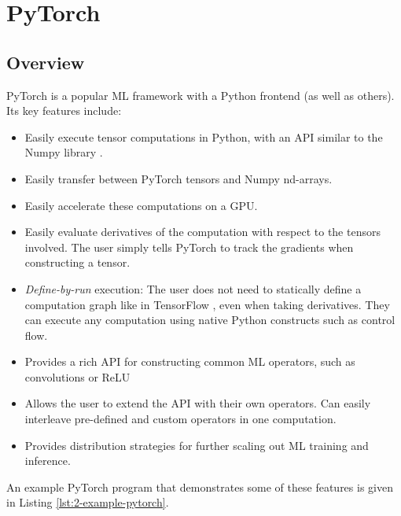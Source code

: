 \section{PyTorch}
\subsection{Overview}
PyTorch \cite{Paszke2017} is a popular ML framework with a Python frontend (as well as others).
Its key features include:
\begin{itemize}[topsep=0.2em, parsep=0.5\parskip]
    \item Easily execute tensor computations in Python, with an API similar to the Numpy library \cite{VanDerWalt2011}.
    \item Easily transfer between PyTorch tensors and Numpy nd-arrays.
    \item Easily accelerate these computations on a GPU.
    \item Easily evaluate derivatives of the computation with respect to the tensors involved.
    The user simply tells PyTorch to track the gradients when constructing a tensor.
    \item \textit{Define-by-run} execution: The user does not need to statically define a computation graph like in TensorFlow \cite{tensorflow2015-whitepaper}, even when taking derivatives.
    They can execute any computation using native Python constructs such as control flow.
    \item Provides a rich API for constructing common ML operators, such as convolutions or ReLU
    \item Allows the user to extend the API with their own operators.
    Can easily interleave pre-defined and custom operators in one computation.
    \item Provides distribution strategies for further scaling out ML training and inference.
\end{itemize}

An example PyTorch program that demonstrates some of these features is given in Listing \ref{lst:2-example-pytorch}.


\vfill


